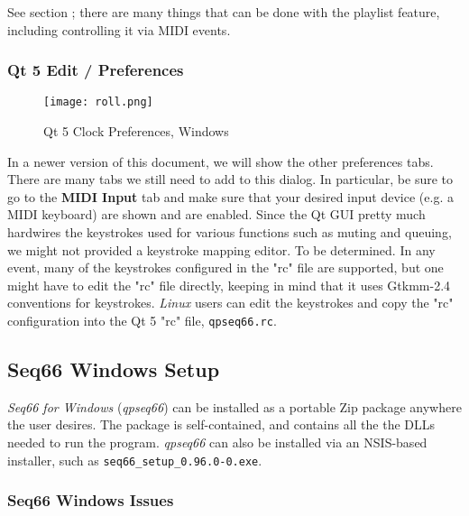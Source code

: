   See section ; there are many things that can be
   done with the playlist feature, including controlling it via MIDI events.

\subsubsection{Qt 5 Edit / Preferences}
\label{subsubsec:qt_portmidi_qt5_edit_prefs}

\begin{figure}[H]
   \centering 
   \texttt{[image: roll.png]}
   \caption{Qt 5 Clock Preferences, Windows}
   \label{fig:qt5_prefs_clock_windows}
\end{figure}

   In a newer version of this document, we will show the other preferences
   tabs.  There are many tabs we still need to add to this dialog.
   In particular, be sure to go to the \textbf{MIDI Input} tab and
   make sure that your desired input device (e.g. a MIDI keyboard) are shown
   and are enabled.
   Since the Qt GUI pretty much hardwires the keystrokes used for various
   functions such as muting and queuing, we might not provided a keystroke
   mapping editor.  To be determined.
   In any event, many of the keystrokes configured in the "rc" file are
   supported, but one might have to edit the "rc" file directly, keeping
   in mind that it uses Gtkmm-2.4 conventions for keystrokes.
   \textsl{Linux} users can edit the keystrokes and copy the "rc" configuration
   into the Qt 5 "rc" file, \texttt{qpseq66.rc}.

\subsection{Seq66 Windows Setup}
\label{subsec:qt_portmidi_windows_setup}

   \textsl{Seq66 for Windows} (\textsl{qpseq66}) can be installed
   as a portable Zip package anywhere the user desires.  The package is
   self-contained, and contains all the the DLLs needed to run the program.
   \textsl{qpseq66} can also be installed via an NSIS-based installer,
   such as \texttt{seq66\_setup\_0.96.0-0.exe}.

\subsubsection{Seq66 Windows Issues}
\label{subsubsec:qt_portmidi_windows_setup_issues}

